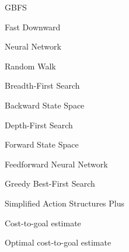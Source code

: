 
\begin{listofabbrv}{GBFS}
    \item[FD] Fast Downward
    \item[NN] Neural Network
    \item[RW] Random Walk
    \item[BFS] Breadth-First Search
    \item[BSS] Backward State Space
    \item[DFS] Depth-First Search
    \item[FSS] Forward State Space
    \item[FNN] Feedforward Neural Network
    \item[GBFS] Greedy Best-First Search
    \item[\sas] Simplified Action Structures Plus
\end{listofabbrv}

\begin{listofsymbols}{\hstar}
    \item[\h] Cost-to-goal estimate
    \item[\hstar] Optimal cost-to-goal estimate
\end{listofsymbols}
